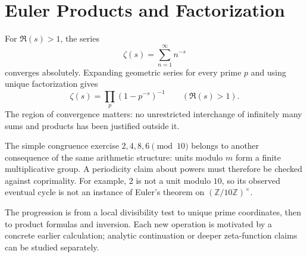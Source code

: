 \section{Euler Products and Factorization}

For \(\Re(s)>1\), the series
\[
 \zeta(s)=\sum_{n=1}^{\infty}n^{-s}
\]
converges absolutely. Expanding geometric series for every prime \(p\) and using unique factorization gives
\[
 \boxed{\zeta(s)=\prod_p(1-p^{-s})^{-1}\qquad(\Re(s)>1).}
\]
The region of convergence matters: no unrestricted interchange of infinitely many sums and products has been justified outside it.

The simple congruence exercise \(2,4,8,6\pmod{10}\) belongs to another consequence of the same arithmetic structure: units modulo \(m\) form a finite multiplicative group. A periodicity claim about powers must therefore be checked against coprimality. For example, \(2\) is not a unit modulo \(10\), so its observed eventual cycle is not an instance of Euler's theorem on \((\mathbb Z/10\mathbb Z)^\times\).

The progression is from a local divisibility test to unique prime coordinates, then to product formulas and inversion. Each new operation is motivated by a concrete earlier calculation; analytic continuation or deeper zeta-function claims can be studied separately.
